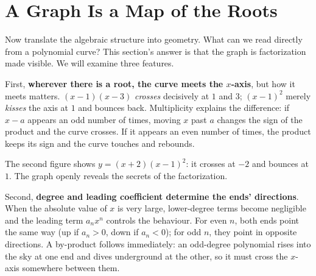 \section{A Graph Is a Map of the Roots}

Now translate the algebraic structure into geometry. What can we read directly from a polynomial curve? This section's answer is that the graph is factorization made visible. We will examine three features.

First, \textbf{wherever there is a root, the curve meets the $x$-axis}, but how it meets matters. $(x-1)(x-3)$ \emph{crosses} decisively at $1$ and $3$; $(x-1)^2$ merely \emph{kisses} the axis at $1$ and bounces back. Multiplicity explains the difference: if $x-a$ appears an odd number of times, moving $x$ past $a$ changes the sign of the product and the curve crosses. If it appears an even number of times, the product keeps its sign and the curve touches and rebounds.

\begin{center}
\end{center}

\begin{center}
\end{center}

The second figure shows $y=(x+2)(x-1)^2$: it crosses at $-2$ and bounces at $1$. The graph openly reveals the secrets of the factorization.

Second, \textbf{degree and leading coefficient determine the ends' directions}. When the absolute value of $x$ is very large, lower-degree terms become negligible and the leading term $a_n x^n$ controls the behaviour. For even $n$, both ends point the same way (up if $a_n>0$, down if $a_n<0$); for odd $n$, they point in opposite directions. A by-product follows immediately: an odd-degree polynomial rises into the sky at one end and dives underground at the other, so it must cross the $x$-axis somewhere between them.

